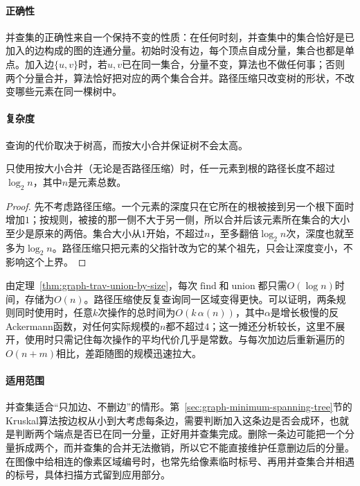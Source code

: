 \paragraph{正确性}
并查集的正确性来自一个保持不变的性质：在任何时刻，并查集中的集合恰好是已加入的边构成的图的连通分量。初始时没有边，每个顶点自成分量，集合也都是单点。加入边$\{u,v\}$时，若$u,v$已在同一集合，分量不变，算法也不做任何事；否则两个分量合并，算法恰好把对应的两个集合合并。路径压缩只改变树的形状，不改变哪些元素在同一棵树中。

\paragraph{复杂度}
查询的代价取决于树高，而按大小合并保证树不会太高。

\begin{theorem}[按大小合并的树高]
\label{thm:graph-trav-union-by-size}
只使用按大小合并（无论是否路径压缩）时，任一元素到根的路径长度不超过$\log_2 n$，其中$n$是元素总数。
\end{theorem}

\begin{proof}
先不考虑路径压缩。一个元素的深度只在它所在的根被接到另一个根下面时增加$1$；按规则，被接的那一侧不大于另一侧，所以合并后该元素所在集合的大小至少是原来的两倍。集合大小从$1$开始，不超过$n$，至多翻倍$\log_2 n$次，深度也就至多为$\log_2 n$。路径压缩只把元素的父指针改为它的某个祖先，只会让深度变小，不影响这个上界。
\end{proof}

由定理~\ref{thm:graph-trav-union-by-size}，每次$\operatorname{find}$和$\operatorname{union}$都只需$O(\log n)$时间，存储为$O(n)$。路径压缩使反复查询同一区域变得更快。可以证明，两条规则同时使用时，任意$k$次操作的总时间为$O(k\,\alpha(n))$，其中$\alpha$是增长极慢的反Ackermann函数，对任何实际规模的$n$都不超过$4$；这一摊还分析较长，这里不展开，使用时只需记住每次操作的平均代价几乎是常数。与每次加边后重新遍历的$O(n+m)$相比，差距随图的规模迅速拉大。

\paragraph{适用范围}
并查集适合“只加边、不删边”的情形。第~\ref{sec:graph-minimum-spanning-tree}节的Kruskal算法按边权从小到大考虑每条边，需要判断加入这条边是否会成环，也就是判断两个端点是否已在同一分量，正好用并查集完成。删除一条边可能把一个分量拆成两个，而并查集的合并无法撤销，所以它不能直接维护任意删边后的分量。在图像中给相连的像素区域编号时，也常先给像素临时标号、再用并查集合并相遇的标号，具体扫描方式留到应用部分。

